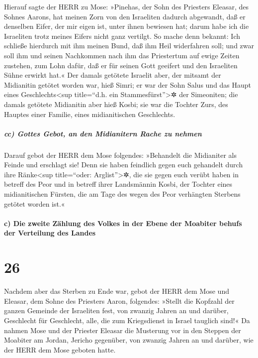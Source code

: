Hierauf sagte der HERR zu Mose: »Pinehas,
der Sohn des Priesters Eleasar, des Sohnes Aarons, hat meinen Zorn von
den Israeliten dadurch abgewandt, daß er denselben Eifer, der mir eigen
ist, unter ihnen bewiesen hat; darum habe ich die Israeliten trotz
meines Eifers nicht ganz vertilgt. So mache denn bekannt:
Ich schließe hierdurch mit ihm meinen Bund, daß ihm Heil widerfahren
soll; und zwar soll ihm und seinen Nachkommen nach ihm
das Priestertum auf ewige Zeiten zustehen, zum Lohn dafür, daß er für
seinen Gott geeifert und den Israeliten Sühne erwirkt hat.«
Der damals getötete Israelit aber, der mitsamt der
Midianitin getötet worden war, hieß Simri; er war der Sohn Salus und das
Haupt eines Geschlechts\textless sup title=``d.h. ein
Stammesfürst''\textgreater✲ der Simeoniten; die damals
getötete Midianitin aber hieß Kosbi; sie war die Tochter Zurs, des
Hauptes einer Familie, eines midianitischen Geschlechts.

\hypertarget{cc-gottes-gebot-an-den-midianitern-rache-zu-nehmen}{%
\subparagraph{cc) Gottes Gebot, an den Midianitern Rache zu
nehmen}\label{cc-gottes-gebot-an-den-midianitern-rache-zu-nehmen}}

Darauf gebot der HERR dem Mose folgendes:
»Behandelt die Midianiter als Feinde und erschlagt sie!
Denn sie haben feindlich gegen euch gehandelt durch ihre
Ränke\textless sup title=``oder: Arglist''\textgreater✲, die sie gegen
euch verübt haben in betreff des Peor und in betreff ihrer Landsmännin
Kosbi, der Tochter eines midianitischen Fürsten, die am Tage des wegen
des Peor verhängten Sterbens getötet worden ist.«

\hypertarget{c-die-zweite-zuxe4hlung-des-volkes-in-der-ebene-der-moabiter-behufs-der-verteilung-des-landes}{%
\paragraph{c) Die zweite Zählung des Volkes in der Ebene der Moabiter
behufs der Verteilung des
Landes}\label{c-die-zweite-zuxe4hlung-des-volkes-in-der-ebene-der-moabiter-behufs-der-verteilung-des-landes}}

\hypertarget{section-25}{%
\section{26}\label{section-25}}

Nachdem aber das Sterben zu Ende war, gebot der HERR dem
Mose und Eleasar, dem Sohne des Priesters Aaron, folgendes:
»Stellt die Kopfzahl der ganzen Gemeinde der Israeliten
fest, von zwanzig Jahren an und darüber, Geschlecht für Geschlecht,
alle, die zum Kriegsdienst in Israel tauglich sind!« Da
nahmen Mose und der Priester Eleasar die Musterung vor in den Steppen
der Moabiter am Jordan, Jericho gegenüber, von zwanzig
Jahren an und darüber, wie der HERR dem Mose geboten hatte.

